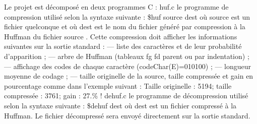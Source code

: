 Le projet est décomposé en deux programmes C \+: huf.\+c le programme de compression utilisé selon la syntaxe suivante \+: \$huf source dest où source est un fichier quelconque et où dest est le nom du fichier généré par compression à la Huffman du fichier source . Cette compression doit afficher les informations suivantes sur la sortie standard \+: — liste des caractères et de leur probabilité d’apparition ; — arbre de Huffman (tableaux fg fd parent ou par indentation) ; — affichage des codes de chaque caractère (code\+Char(\+E)=010100) ; — longueur moyenne de codage ; — taille originelle de la source, taille compressée et gain en pourcentage comme dans l’exemple suivant \+: Taille originelle \+: 5194; taille compressée \+: 3761; gain \+: 27.\% ! dehuf.\+c le programme de décompression utilisé selon la syntaxe suivante \+: \$dehuf dest où dest est un fichier compressé à la Huffman. Le fichier décompressé sera envoyé directement sur la sortie standard. 